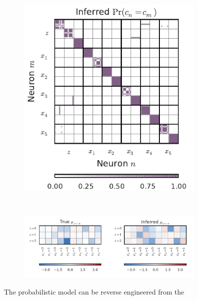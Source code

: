 \begin{figure}[t!]
\begin{subfigure}[b]{2.75in}
   \centering
   \caption{}
   \vspace{-.3in}
   \includegraphics[width=\textwidth]{figures/ch9/mixture_cocluster_probability}
   \label{fig:mixture_cocluster}
 \end{subfigure} \\
 \begin{subfigure}[b]{5.5in}
   \centering
   \caption{}
   \vspace{-.4in}
   \includegraphics[width=\textwidth]{figures/ch9/mixture_prob_weights}
   \label{fig:mixture_prob_weights}
 \end{subfigure}
 \vspace{-.3in}
 \caption[Reverse engineering probabilistic models from neural spike
   trains] {The probabilistic model can be reverse engineered from the
}
\end{figure}
